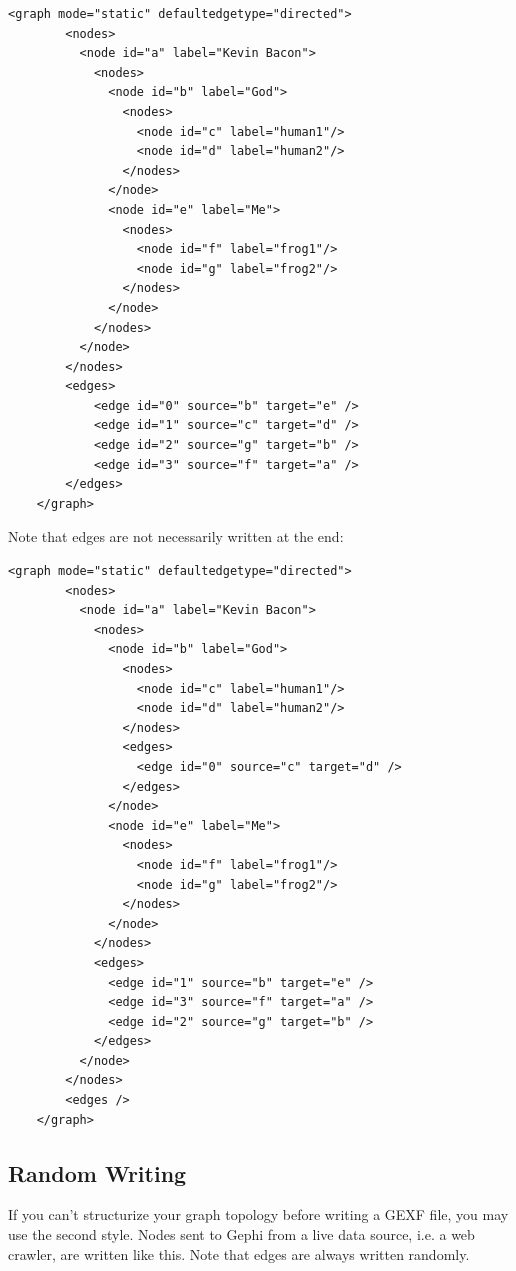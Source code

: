 \documentclass[a4paper,10pt]{article}
\begin{document}
\lstset{ style=gexf }
\begin{lstlisting}[caption={First way},label=hierarchy1]
    <graph mode="static" defaultedgetype="directed">
        <nodes>
          <node id="a" label="Kevin Bacon">
            <nodes>
              <node id="b" label="God">
                <nodes>
                  <node id="c" label="human1"/>
                  <node id="d" label="human2"/>
                </nodes>
              </node>
              <node id="e" label="Me">
                <nodes>
                  <node id="f" label="frog1"/>
                  <node id="g" label="frog2"/>
                </nodes>
              </node>
            </nodes>
          </node>
        </nodes>
        <edges>
            <edge id="0" source="b" target="e" />
            <edge id="1" source="c" target="d" />
            <edge id="2" source="g" target="b" />
            <edge id="3" source="f" target="a" />
        </edges>
    </graph>
\end{lstlisting}

Note that edges are not necessarily written at the end:
\lstset{ style=gexf }
\begin{lstlisting}[caption={First way with edges inside clusters},label=hierarchy11]
    <graph mode="static" defaultedgetype="directed">
        <nodes>
          <node id="a" label="Kevin Bacon">
            <nodes>
              <node id="b" label="God">
                <nodes>
                  <node id="c" label="human1"/>
                  <node id="d" label="human2"/>
                </nodes>
                <edges>
                  <edge id="0" source="c" target="d" />
                </edges>
              </node>
              <node id="e" label="Me">
                <nodes>
                  <node id="f" label="frog1"/>
                  <node id="g" label="frog2"/>
                </nodes>
              </node>
            </nodes>
            <edges>
              <edge id="1" source="b" target="e" />
              <edge id="3" source="f" target="a" />
              <edge id="2" source="g" target="b" />
            </edges>
          </node>
        </nodes>
        <edges />
    </graph>
\end{lstlisting}

\subsection{Random Writing}

If you can't structurize your graph topology before writing a GEXF file, you may use the second style. Nodes sent to Gephi from a live data source, i.e. a web crawler, are written like this. Note that edges are always written randomly.
\end{document}
